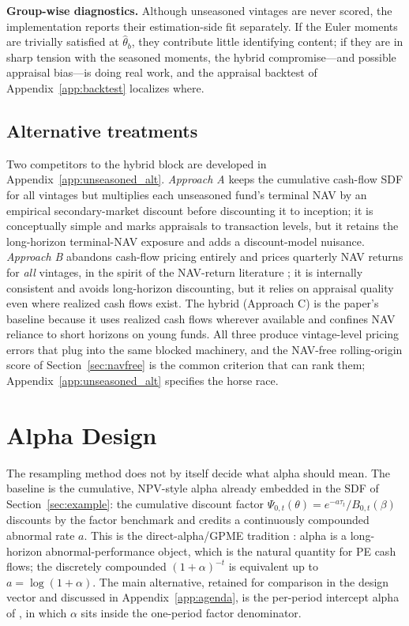 \documentclass[11pt]{article}
\begin{document}
\textbf{Group-wise diagnostics.} Although unseasoned vintages are never scored, the implementation reports their estimation-side fit separately. If the Euler moments are trivially satisfied at \(\hat\theta_b\), they contribute little identifying content; if they are in sharp tension with the seasoned moments, the hybrid compromise---and possible appraisal bias---is doing real work, and the appraisal backtest of Appendix~\ref{app:backtest} localizes where.

\subsection{Alternative treatments}
\label{sec:alternatives}

Two competitors to the hybrid block are developed in Appendix~\ref{app:unseasoned_alt}. \emph{Approach A} keeps the cumulative cash-flow SDF for all vintages but multiplies each unseasoned fund's terminal NAV by an empirical secondary-market discount before discounting it to inception; it is conceptually simple and marks appraisals to transaction levels, but it retains the long-horizon terminal-NAV exposure and adds a discount-model nuisance. \emph{Approach B} abandons cash-flow pricing entirely and prices quarterly NAV returns for \emph{all} vintages, in the spirit of the NAV-return literature \citep{brown2023nowcasting,GhyselsGredilAndreou2025}; it is internally consistent and avoids long-horizon discounting, but it relies on appraisal quality even where realized cash flows exist. The hybrid (Approach C) is the paper's baseline because it uses realized cash flows wherever available and confines NAV reliance to short horizons on young funds. All three produce vintage-level pricing errors that plug into the same blocked machinery, and the NAV-free rolling-origin score of Section~\ref{sec:navfree} is the common criterion that can rank them; Appendix~\ref{app:unseasoned_alt} specifies the horse race.

\section{Alpha Design}
\label{sec:alpha_design}

The resampling method does not by itself decide what alpha should mean. The baseline is the cumulative, NPV-style alpha already embedded in the SDF of Section~\ref{sec:example}: the cumulative discount factor \(\Psi_{0,t}(\theta)=e^{-a\tau_t}/B_{0,t}(\beta)\) discounts by the factor benchmark and credits a continuously compounded abnormal rate \(a\). This is the direct-alpha/GPME tradition \citep{GredilGriffithsStucke2023,KortewegNagel2016,KortewegNagel2025}: alpha is a long-horizon abnormal-performance object, which is the natural quantity for PE cash flows; the discretely compounded \((1+\alpha)^{-t}\) is equivalent up to \(a=\log(1+\alpha)\). The main alternative, retained for comparison in the design vector and discussed in Appendix~\ref{app:agenda}, is the per-period intercept alpha of \citet{DriessenLinPhalippou2012}, in which \(\alpha\) sits inside the one-period factor denominator.
\end{document}
